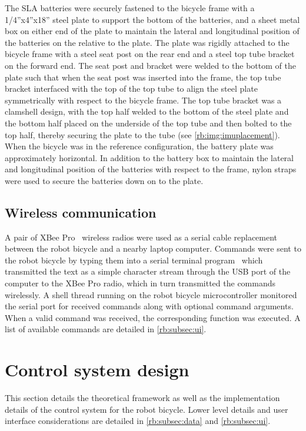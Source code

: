 The SLA batteries were securely fastened to the bicycle frame with a
1/4''x4''x18'' steel plate to support the bottom of the batteries, and a sheet
metal box on either end of the plate to maintain the lateral and longitudinal
position of the batteries on the relative to the plate. The plate was rigidly
attached to the bicycle frame with a steel seat post on the rear end and a
steel top tube bracket on the forward end. The seat post and bracket were
welded to the bottom of the plate such that when the seat post was inserted
into the frame, the top tube bracket interfaced with the top of the top tube to
align the steel plate symmetrically with respect to the bicycle frame. The top
tube bracket was a clamshell design, with the top half welded to the bottom of
the steel plate and the bottom half placed on the underside of the top tube and
then bolted to the top half, thereby securing the plate to the tube (see
\autoref{rb:img:imuplacement}). When the bicycle was in the reference
configuration, the battery plate was approximately horizontal. In addition to
the battery box to maintain the lateral and longitudinal position of the
batteries with respect to the frame, nylon straps were used to secure the
batteries down on to the plate.

\subsection{Wireless communication} \label{rb:subsec:wireless}
A pair of XBee Pro~\cite{XBeePro} wireless radios were used as a serial cable
replacement between the robot bicycle and a nearby laptop computer. Commands
were sent to the robot bicycle by typing them into a serial terminal
program~\cite{moserial} which transmitted the text as a simple character stream
through the USB port of the computer to the XBee Pro radio, which in turn
transmitted the commands wirelessly. A shell thread running on the robot
bicycle microcontroller monitored the serial port for received commands along
with optional command arguments. When a valid command was received, the
corresponding function was executed. A list of available commands are detailed
in \autoref{rb:subsec:ui}.


\section{Control system design} \label{rb:sec:control}
This section details the theoretical framework as well as the implementation
details of the control system for the robot bicycle. Lower level details and
user interface considerations are detailed in \autoref{rb:subsec:data} and
\autoref{rb:subsec:ui}.

